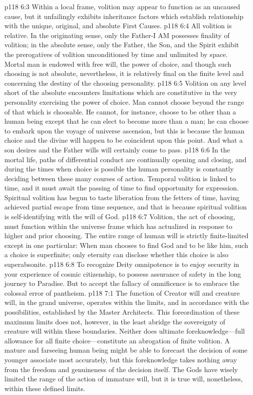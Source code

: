 \pc \vs p118 6:3 Within a local frame, volition may appear to function as an uncaused cause, but it unfailingly exhibits inheritance factors which establish relationship with the unique, original, and absolute First Causes.
\vs p118 6:4 All volition is relative. In the originating sense, only the Father\hyp{}I AM possesses finality of volition; in the absolute sense, only the Father, the Son, and the Spirit exhibit the prerogatives of volition unconditioned by time and unlimited by space. Mortal man is endowed with free will, the power of choice, and though such choosing is not absolute, nevertheless, it is relatively final on the finite level and concerning the destiny of the choosing personality.
\vs p118 6:5 Volition on any level short of the absolute encounters limitations which are constitutive in the very personality exercising the power of choice. Man cannot choose beyond the range of that which is choosable. He cannot, for instance, choose to be other than a human being except that he can elect to become more than a man; he can choose to embark upon the voyage of universe ascension, but this is because the human choice and the divine will happen to be coincident upon this point. And what a son desires and the Father wills will certainly come to pass.
\vs p118 6:6 In the mortal life, paths of differential conduct are continually opening and closing, and during the times when choice is possible the human personality is constantly deciding between these many courses of action. Temporal volition is linked to time, and it must await the passing of time to find opportunity for expression. Spiritual volition has begun to taste liberation from the fetters of time, having achieved partial escape from time sequence, and that is because spiritual volition is self\hyp{}identifying with the will of God.\plusone
\vs p118 6:7 Volition, the act of choosing, must function within the universe frame which has actualized in response to higher and prior choosing. The entire range of human will is strictly finite\hyp{}limited except in one particular: When man chooses to find God and to be like him, such a choice is superfinite; only eternity can disclose whether this choice is also superabsonite.
\pc \vs p118 6:8 To recognize Deity omnipotence is to enjoy security in your experience of cosmic citizenship, to possess assurance of safety in the long journey to Paradise. But to accept the fallacy of omnificence is to embrace the colossal error of pantheism.
\vs p118 7:1 The function of Creator will and creature will, in the grand universe, operates within the limits, and in accordance with the possibilities, established by the Master Architects. This foreordination of these maximum limits does not, however, in the least abridge the sovereignty of creature will within these boundaries. Neither does ultimate foreknowledge---full allowance for all finite choice---constitute an abrogation of finite volition. A mature and farseeing human being might be able to forecast the decision of some younger associate most accurately, but this foreknowledge takes nothing away from the freedom and genuineness of the decision itself. The Gods have wisely limited the range of the action of immature will, but it is true will, nonetheless, within these defined limits.

